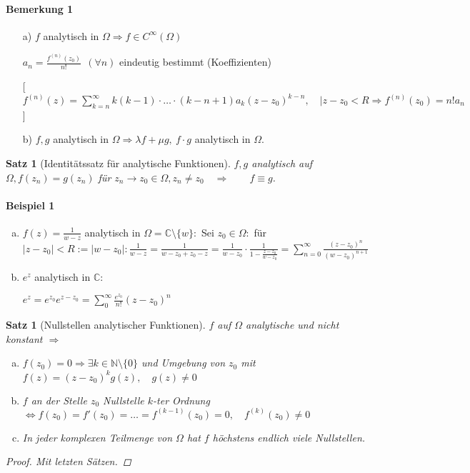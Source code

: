 \documentclass[ngerman,halfparskip]{scrartcl}
\newtheorem{satz}{Satz}[section]
\newtheorem*{satz*}{Satz}
\theoremstyle{definition}
\def\C{\mathbb C}
\begin{document}
\paragraph{Bemerkung 1}
\begin{itemize}
\item [a)] $f$ analytisch in $\Omega\Rightarrow f\in C^\infty (\Omega)$

$a_n=\frac{f^{(n)}(z_0)}{n!}~~(\forall n)$ eindeutig bestimmt (Koeffizienten)

[$f^{(n)}(z)=\sum\limits_{k=n}^\infty k(k-1)\cdot\ldots\cdot(k-n+1)a_k(z-z_0)^ {k-n}, \quad |z-z_0<R \Rightarrow f^{(n)}(z_0)=n!a_n$]

\item [b)] $f,g$ analytisch in $\Omega \Rightarrow \lambda f + \mu g, ~f\cdot g$ analytisch in $\Omega$.
\end{itemize}

\begin{satz*}[Identitätssatz für analytische Funktionen]
$f,g$ analytisch auf $\Omega, f(z_n)=g(z_n)$ für $z_n\rightarrow z_0\in\Omega, z_n\neq z_0\quad \Rightarrow
\qquad f\equiv g$.
\end{satz*}

\paragraph{Beispiel 1}\begin{enumerate}[a)]
\item $f(z)=\frac 1{w-z}$ analytisch in $\Omega=\C\setminus \{w\}:$
Sei $z_0\in\Omega: $ für $|z-z_0|<R:=|w-z_0|: \frac 1 {w-z}=\frac 1 {w-z_0+z_0-z}=\frac 1 {w-z_0}\cdot \frac 1 {1-\frac{z-z_0}{w-z_0}}=\sum\limits_{n=0}^\infty \frac {(z-z_0)^n}{(w-z_0)^{n+1}}$
\item  $e^z$ analytisch in $\C:$

$e^z=e^{z_0}e^{z-z_0}=\sum\limits_0^\infty \frac{e^{z_0}}{n!}(z-z_0)^n$
\end{enumerate}

\begin{satz}[Nullstellen analytischer Funktionen]
$f$ auf $\Omega$ analytische und nicht konstant $\Rightarrow$
\begin{enumerate}[a)]
\item $f(z_0)=0 \Rightarrow \exists k\in\mathbb N\setminus \{0\}$ und Umgebung von $z_0$ mit $f(z)=(z-z_0)^kg(z), \quad g(z)\neq 0$
\item $f$ an der Stelle $z_0$ Nullstelle $k$-ter Ordnung $\Leftrightarrow f(z_0)=f'(z_0)=\ldots=f^{(k-1)}(z_0)=0, \quad f^{(k)}(z_0)\neq 0$
\item In jeder komplexen Teilmenge von $\Omega$ hat $f$ höchstens endlich viele Nullstellen.
\end{enumerate}
\begin{proof}
Mit letzten Sätzen.
\end{proof}
\end{satz}
\end{document}
